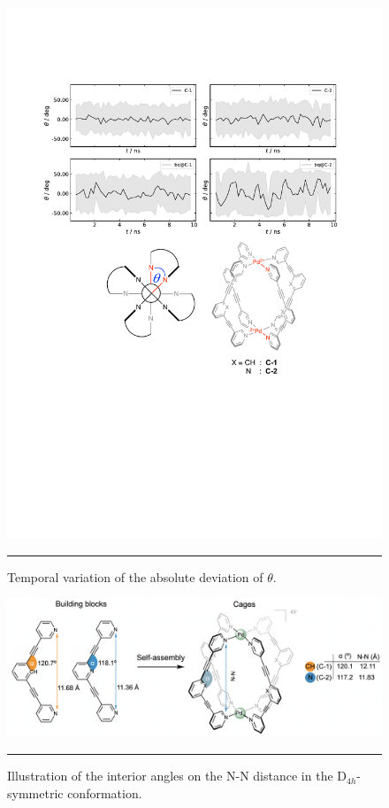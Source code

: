 \documentclass[../../main.tex]{subfiles}
\begin{document}
\begin{figure}[h!]
	\vspace{0.4cm}
	\centering
	\includegraphics[width=\textwidth]{3/da//figs/figS6.pdf}
	\vspace{0.2cm}
	\hrule
	\caption{Temporal variation of the absolute deviation of $\theta$.}
	\label{fig::si_da_6}
\end{figure}


\begin{figure}[h!]
	\vspace{0.4cm}
	\centering
	\includegraphics[width=\textwidth]{3/da//figs/figS7}
	\vspace{0.2cm}
	\hrule
	\caption{Illustration of the interior angles on the N-N distance in the D$_{4h}$-symmetric conformation.}
	\label{fig::si_da_7}
\end{figure}
\end{document}
